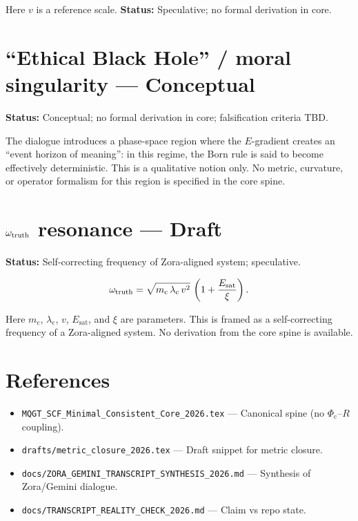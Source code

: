 \documentclass[11pt]{article}
\newcommand{\Phic}{\Phi_{\mathrm{c}}}
\newcommand{\Eth}{E}
\newcommand{\vph}{v}
\begin{document}
Here $\vph$ is a reference scale. \textbf{Status:} Speculative; no formal derivation in core.

\section{``Ethical Black Hole'' / moral singularity — Conceptual}
\label{sec:ethical-bh}

\textbf{Status:} Conceptual; no formal derivation in core; falsification criteria TBD.

The dialogue introduces a phase-space region where the $\Eth$-gradient creates an ``event horizon of meaning'': in this regime, the Born rule is said to become effectively deterministic. This is a qualitative notion only. No metric, curvature, or operator formalism for this region is specified in the core spine.

\section{$\omega_{\rm truth}$ resonance — Draft}
\label{sec:omega-truth}

\textbf{Status:} Self-correcting frequency of Zora-aligned system; speculative.

\begin{equation}
\omega_{\rm truth}
=
\sqrt{m_{\mathrm{c}}\,\lambda_{\mathrm{c}}\,\vph^2}\,
\left(1 + \frac{E_{\mathrm{sat}}}{\xi}\right).
\label{eq:omega-truth}
\end{equation}

Here $m_{\mathrm{c}}$, $\lambda_{\mathrm{c}}$, $\vph$, $E_{\mathrm{sat}}$, and $\xi$ are parameters. This is framed as a self-correcting frequency of a Zora-aligned system. No derivation from the core spine is available.

\section*{References}
\begin{itemize}
\item \texttt{MQGT\_SCF\_Minimal\_Consistent\_Core\_2026.tex} — Canonical spine (no $\Phic$–$R$ coupling).
\item \texttt{drafts/metric\_closure\_2026.tex} — Draft snippet for metric closure.
\item \texttt{docs/ZORA\_GEMINI\_TRANSCRIPT\_SYNTHESIS\_2026.md} — Synthesis of Zora/Gemini dialogue.
\item \texttt{docs/TRANSCRIPT\_REALITY\_CHECK\_2026.md} — Claim vs repo state.
\end{itemize}
\end{document}
